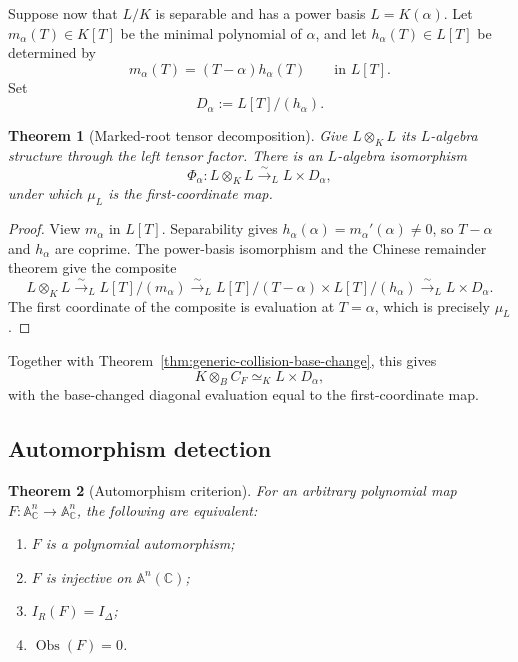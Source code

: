 \documentclass[11pt]{article}
\newtheorem{theorem}{Theorem}[section]
\theoremstyle{remark}
\newcommand{\A}{\mathbb A}
\newcommand{\C}{\mathbb C}
\newcommand{\Obs}{\operatorname{Obs}}
\begin{document}
Suppose now that \(L/K\) is separable and has a power basis
\(L=K(\alpha)\).  Let \(m_\alpha(T)\in K[T]\) be the minimal polynomial
of \(\alpha\), and let \(h_\alpha(T)\in L[T]\) be determined by
\[
  m_\alpha(T)=(T-\alpha)h_\alpha(T)
  \qquad\text{in }L[T].
\]
Set
\[
  D_\alpha:=L[T]/(h_\alpha).
\]

\begin{theorem}[Marked-root tensor decomposition]
\label{thm:marked-root-tensor-decomposition}
Give \(L\otimes_KL\) its \(L\)-algebra structure through the left tensor
factor.  There is an \(L\)-algebra isomorphism
\[
  \Phi_\alpha\colon L\otimes_KL
  \xrightarrow{\sim}_L
  L\times D_\alpha,
\]
under which \(\mu_L\) is the first-coordinate map.
\end{theorem}

\begin{proof}
View \(m_\alpha\) in \(L[T]\).  Separability gives
\(h_\alpha(\alpha)=m_\alpha'(\alpha)\neq0\), so \(T-\alpha\) and
\(h_\alpha\) are coprime.  The power-basis isomorphism and the Chinese
remainder theorem give the composite
\[
  L\otimes_KL
  \xrightarrow{\sim}_L L[T]/(m_\alpha)
  \xrightarrow{\sim}_L
  L[T]/(T-\alpha)\times L[T]/(h_\alpha)
  \xrightarrow{\sim}_L L\times D_\alpha.
\]
The first coordinate of the composite is evaluation at \(T=\alpha\),
which is precisely \(\mu_L\).
\end{proof}

Together with Theorem~\ref{thm:generic-collision-base-change}, this gives
\[
  K\otimes_BC_F
  \simeq_K
  L\times D_\alpha,
\]
with the base-changed diagonal evaluation equal to the first-coordinate
map.

\subsection{Automorphism detection}
\label{sec:automorphism-detection}

\begin{theorem}[Automorphism criterion]
\label{thm:automorphism-criterion}
For an arbitrary polynomial map
\(F\colon\A^n_{\C}\to\A^n_{\C}\), the following are equivalent:
\begin{enumerate}[label=\textup{(\arabic*)}]
  \item \(F\) is a polynomial automorphism;
  \item \(F\) is injective on \(\A^n(\C)\);
  \item \(I_R(F)=I_\Delta\);
  \item \(\Obs(F)=0\).
\end{enumerate}
\end{theorem}
\end{document}
